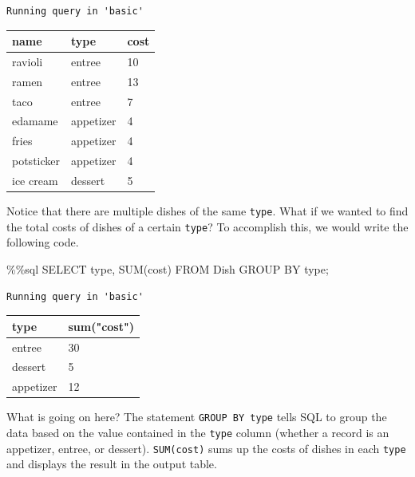 \documentclass[
  letterpaper,
  DIV=11,
  numbers=noendperiod]{scrreprt}
\newenvironment{Shaded}{\begin{snugshade}}{\end{snugshade}}
\newcommand{\BuiltInTok}[1]{\textcolor[rgb]{0.00,0.23,0.31}{#1}}
\newcommand{\NormalTok}[1]{\textcolor[rgb]{0.00,0.23,0.31}{#1}}
\newcommand{\OperatorTok}[1]{\textcolor[rgb]{0.37,0.37,0.37}{#1}}
\begin{document}
\begin{verbatim}
Running query in 'basic'
\end{verbatim}

\begin{longtable}[]{@{}lll@{}}
\toprule\noalign{}
name & type & cost \\
\midrule\noalign{}
\endhead
\bottomrule\noalign{}
\endlastfoot
ravioli & entree & 10 \\
ramen & entree & 13 \\
taco & entree & 7 \\
edamame & appetizer & 4 \\
fries & appetizer & 4 \\
potsticker & appetizer & 4 \\
ice cream & dessert & 5 \\
\end{longtable}

Notice that there are multiple dishes of the same \texttt{type}. What if
we wanted to find the total costs of dishes of a certain \texttt{type}?
To accomplish this, we would write the following code.

\begin{Shaded}
\begin{Highlighting}[]
\OperatorTok{\%\%}\NormalTok{sql}
\NormalTok{SELECT }\BuiltInTok{type}\NormalTok{, SUM(cost)}
\NormalTok{FROM Dish}
\NormalTok{GROUP BY }\BuiltInTok{type}\OperatorTok{;}
\end{Highlighting}
\end{Shaded}

\begin{verbatim}
Running query in 'basic'
\end{verbatim}

\begin{longtable}[]{@{}ll@{}}
\toprule\noalign{}
type & sum("cost") \\
\midrule\noalign{}
\endhead
\bottomrule\noalign{}
\endlastfoot
entree & 30 \\
dessert & 5 \\
appetizer & 12 \\
\end{longtable}

What is going on here? The statement \texttt{GROUP\ BY\ type} tells SQL
to group the data based on the value contained in the \texttt{type}
column (whether a record is an appetizer, entree, or dessert).
\texttt{SUM(cost)} sums up the costs of dishes in each \texttt{type} and
displays the result in the output table.
\end{document}
